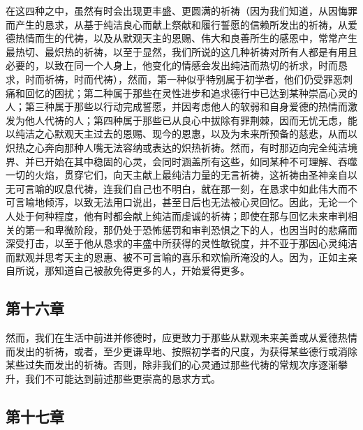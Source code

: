 在这四种之中，虽然有时会出现更丰盛、更圆满的祈祷（因为我们知道，从因悔罪而产生的恳求，从基于纯洁良心而献上祭献和履行誓愿的信赖所发出的祈祷，从爱德热情而生的代祷，以及从默观天主的恩赐、伟大和良善所生的感恩中，常常产生最热切、最炽热的祈祷，以至于显然，我们所说的这几种祈祷对所有人都是有用且必要的，以致在同一个人身上，他变化的情感会发出纯洁而热切的祈求，时而恳求，时而祈祷，时而代祷），然而，第一种似乎特别属于初学者，他们仍受罪恶刺痛和回忆的困扰；第二种属于那些在灵性进步和追求德行中已达到某种崇高心灵的人；第三种属于那些以行动完成誓愿，并因考虑他人的软弱和自身爱德的热情而激发为他人代祷的人；第四种属于那些已从良心中拔除有罪荆棘，因而无忧无虑，能以纯洁之心默观天主过去的恩赐、现今的恩惠，以及为未来所预备的慈悲，从而以炽热之心奔向那种人嘴无法容纳或表达的炽热祈祷。然而，有时那迈向完全纯洁境界、并已开始在其中稳固的心灵，会同时涵盖所有这些，如同某种不可理解、吞噬一切的火焰，贯穿它们，向天主献上最纯洁力量的无言祈祷，这祈祷由圣神亲自以无可言喻的叹息代祷，连我们自己也不明白，就在那一刻，在恳求中如此伟大而不可言喻地倾泻，以致无法用口说出，甚至日后也无法被心灵回忆。因此，无论一个人处于何种程度，他有时都会献上纯洁而虔诚的祈祷；即使在那与回忆未来审判相关的第一和卑微阶段，那仍处于恐怖惩罚和审判恐惧之下的人，也因当时的悲痛而深受打击，以至于他从恳求的丰盛中所获得的灵性敏锐度，并不亚于那因心灵纯洁而默观并思考天主的恩惠、被不可言喻的喜乐和欢愉所淹没的人。因为，正如主亲自所说，那知道自己被赦免得更多的人，开始爱得更多。\par


\subsection{第十六章}

\par

然而，我们在生活中前进并修德时，应更致力于那些从默观未来美善或从爱德热情而发出的祈祷，或者，至少更谦卑地、按照初学者的尺度，为获得某些德行或消除某些过失而发出的祈祷。否则，除非我们的心灵通过那些代祷的常规次序逐渐攀升，我们不可能达到前述那些更崇高的恳求方式。\par


\subsection{第十七章}


